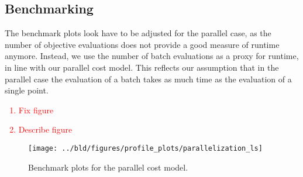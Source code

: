 \newpage
\restoregeometry

\subsection{Benchmarking}\label{subsec:parallelization::benchmarking}

The benchmark plots look have to be adjusted for the parallel case, as the number of objective
evaluations does not provide a good measure of runtime anymore. Instead, we use the number of batch
evaluations as a proxy for runtime, in line with our parallel cost model. This reflects our
assumption that in the parallel case the evaluation of a batch takes as much time as the evaluation
of a single point.

\textcolor{red}{
\begin{enumerate}
    \item Fix figure
    \item Describe figure
\end{enumerate}
}


\begin{figure}[ht]\label{fig:parallelization::benchmark}
    \texttt{[image: ../bld/figures/profile\_plots/parallelization\_ls]}
    \caption{Benchmark plots for the parallel cost model.}
\end{figure}
